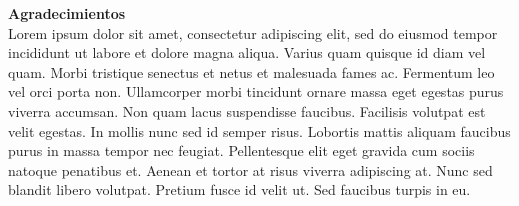 \Huge
\textbf{Agradecimientos}\\

\normalsize
Lorem ipsum dolor sit amet, consectetur adipiscing elit, sed do eiusmod tempor incididunt ut labore et dolore magna aliqua. Varius quam quisque id diam vel quam. Morbi tristique senectus et netus et malesuada fames ac. Fermentum leo vel orci porta non. Ullamcorper morbi tincidunt ornare massa eget egestas purus viverra accumsan. Non quam lacus suspendisse faucibus. Facilisis volutpat est velit egestas. In mollis nunc sed id semper risus. Lobortis mattis aliquam faucibus purus in massa tempor nec feugiat. Pellentesque elit eget gravida cum sociis natoque penatibus et. Aenean et tortor at risus viverra adipiscing at. Nunc sed blandit libero volutpat. Pretium fusce id velit ut. Sed faucibus turpis in eu.
